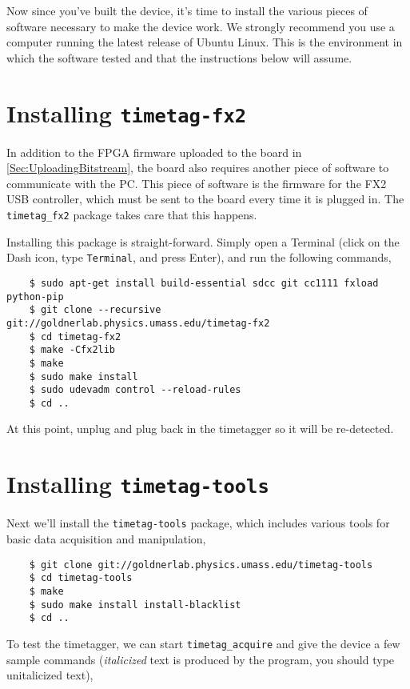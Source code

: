 Now since you've built the device, it's time to install the various
pieces of software necessary to make the device work. We strongly
recommend you use a computer running the latest release of Ubuntu
Linux. This is the environment in which the software tested and that
the instructions below will assume.

\section{Installing {\tt timetag-fx2}}
In addition to the FPGA firmware uploaded to the board in
\ref{Sec:UploadingBitstream}, the board also requires another piece of
software to communicate with the PC. This piece of software is the
firmware for the FX2 USB controller, which must be sent to the board
every time it is plugged in. The {\tt timetag\_fx2} package takes care
that this happens.

Installing this package is straight-forward. Simply open a Terminal
(click on the Dash icon, type {\tt Terminal}, and press Enter), and
run the following commands,

\begin{verbatim}
    $ sudo apt-get install build-essential sdcc git cc1111 fxload python-pip
    $ git clone --recursive git://goldnerlab.physics.umass.edu/timetag-fx2
    $ cd timetag-fx2
    $ make -Cfx2lib
    $ make
    $ sudo make install
    $ sudo udevadm control --reload-rules
    $ cd ..
\end{verbatim}

At this point, unplug and plug back in the timetagger so it will be
re-detected.

\section{Installing {\tt timetag-tools}}

Next we'll install the {\tt timetag-tools} package, which includes
various tools for basic data acquisition and manipulation,

\begin{verbatim}
    $ git clone git://goldnerlab.physics.umass.edu/timetag-tools
    $ cd timetag-tools
    $ make
    $ sudo make install install-blacklist
    $ cd ..
\end{verbatim}

To test the timetagger, we can start {\tt timetag\_acquire} and give
the device a few sample commands ({\it italicized} text is produced by
the program, you should type unitalicized text),

